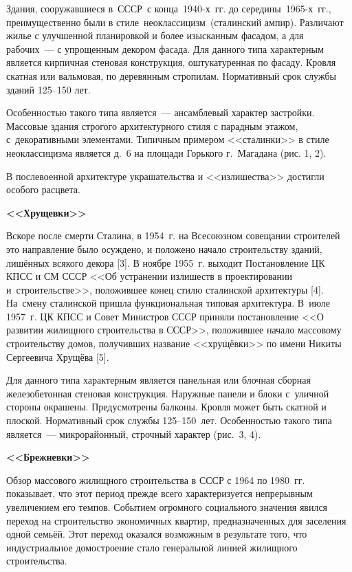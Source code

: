 Здания, сооружавшиеся в СССР с конца 1940-х~гг. до середины 1965-х~гг., преимущественно были в стиле неоклассицизм (сталинский ампир). Различают жилье с улучшенной планировкой и более изысканным фасадом, а для рабочих~--- с упрощенным декором фасада. Для данного типа характерным является кирпичная стеновая конструкция, оштукатуренная по фасаду. Кровля скатная или вальмовая, по деревянным стропилам. Нормативный срок службы зданий 125--150 лет.

Особенностью такого типа является~--- ансамблевый характер застройки. Массовые здания строгого архитектурного стиля с парадным этажом, с~декоративными элементами. Типичным примером <<сталинки>> в стиле неоклассицизма является д.~6 на площади Горького г.~Магадана (рис. 1, 2).

В послевоенной архитектуре украшательства и <<излишества>> достигли особого расцвета.


\vspace{-0.5cm}
\textbf{<<Хрущевки>>}

Вскоре после смерти Сталина, в 1954~г. на Всесоюзном совещании строителей это направление было осуждено, и положено начало строительству зданий, лишённых всякого декора [3].  В ноябре 1955~г. выходит Постановление ЦК КПСС и СМ СССР <<Об устранении излишеств в проектировании и~строительстве>>, положившее конец стилю сталинской архитектуры [4]. На~смену сталинской пришла функциональная типовая архитектура. В~июле 1957~г. ЦК КПСС и Совет Министров СССР приняли постановление <<О развитии жилищного строительства в СССР>>, положившее начало массовому строительству домов, получивших название <<хрущёвки>> по имени Никиты Сергеевича Хрущёва [5].

Для данного типа характерным является панельная или блочная сборная железобетонная стеновая конструкция. Наружные панели и блоки с~уличной стороны окрашены. Предусмотрены балконы.  Кровля может быть скатной и плоской. Нормативный срок службы 125--150~лет. Особенностью такого типа является~--- микрорайонный, строчный характер (рис.~3, 4).



\textbf{<<Брежневки>>}

Обзор массового жилищного строительства в СССР с 1964 по 1980~гг. показывает, что этот период прежде всего характеризуется непрерывным увеличением его темпов. Событием огромного социального значения явился переход на строительство экономичных квартир, предназначенных для заселения одной семьёй. Этот переход оказался возможным в результате того, что индустриальное домостроение стало генеральной линией жилищного строительства.

